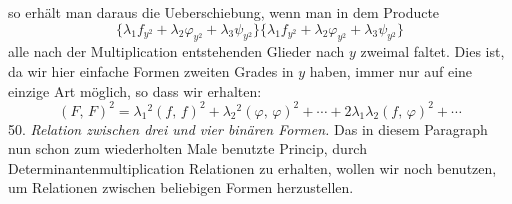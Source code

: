 \documentclass[11pt]{article}
\providecommand{\weberpage}[1]{}
\begin{document}
\weberpage{54}

so erhält man daraus die Ueberschiebung, wenn man in dem Producte
\[
\{\lambda_1 f_{y^2} + \lambda_2 \varphi_{y^2} + \lambda_3 \psi_{y^2}\}\{\lambda_1 f_{y^2} + \lambda_2 \varphi_{y^2} + \lambda_3 \psi_{y^2}\}
\]
alle nach der Multiplication entstehenden Glieder nach $y$ zweimal faltet. Dies ist, da wir hier einfache Formen zweiten Grades in $y$ haben, immer nur auf eine einzige Art möglich, so dass wir erhalten:
\[
(F,\,F)^2 = \lambda_1{}^2(f,\,f)^2 + \lambda_2{}^2(\varphi,\,\varphi)^2 + \cdots + 2\lambda_1\lambda_2(f,\,\varphi)^2 + \cdots
\]
50. \textit{Relation zwischen drei und vier binären Formen.} Das in diesem Paragraph nun schon zum wiederholten Male benutzte Princip, durch Determinantenmultiplication Relationen zu erhalten, wollen wir noch benutzen, um Relationen zwischen beliebigen Formen herzustellen.
\end{document}

